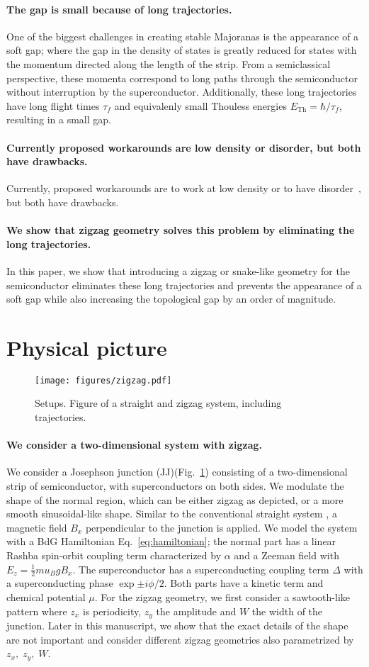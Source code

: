 \documentclass[english, twocolumn, 10pt, aps, superscriptaddress, floatfix, prb, citeautoscript]{revtex4-1}
\renewcommand{\comment}[2]{#2}
\renewcommand{\comment}{\paragraph}
\begin{document}
\comment{The gap is small because of long trajectories.}
One of the biggest challenges in creating stable Majoranas is the appearance of a soft gap; where the gap in the density of states is greatly reduced for states with the momentum directed along the length of the strip.
From a semiclassical perspective, these momenta correspond to long paths through the semiconductor without interruption by the superconductor.
Additionally, these long trajectories have long flight times $\tau_f$ and equivalenly small Thouless energies $E_{\textrm{Th}}=\hbar / \tau_f$, resulting in a small gap.

\comment{Currently proposed workarounds are low density or disorder, but both have drawbacks.}
Currently, proposed workarounds are to work at low density \cite{nijholt2015orbital} or to have disorder~\cite{haim_double-edge_2018}, but both have drawbacks.

\comment{We show that zigzag geometry solves this problem by eliminating the long trajectories.}
In this paper, we show that introducing a zigzag or snake-like geometry for the semiconductor eliminates these long trajectories and prevents the appearance of a soft gap while also increasing the topological gap by an order of magnitude.


\section{Physical picture}

\begin{figure}[!htb]
\texttt{[image: figures/zigzag.pdf]}
\caption{Setups. Figure of a straight and zigzag system, including trajectories.
\label{fig:setup}}
\end{figure}

\comment{We consider a two-dimensional system with zigzag.}
We consider a Josephson junction (JJ)(Fig.~\ref{fig:setup}) consisting of a two-dimensional strip of semiconductor, with superconductors on both sides.
We modulate the shape of the normal region, which can be either zigzag as depicted, or a more smooth sinusoidal-like shape.
Similar to the conventional straight system \cite{pientka2017topological}, a magnetic field $B_x$ perpendicular to the junction is applied.
We model the system with a BdG Hamiltonian Eq.~\eqref{eq:hamiltonian}; the normal part has a linear Rashba spin-orbit coupling term characterized by $\alpha$ and a Zeeman field with $E_z=\frac{1}{2}mu_B g B_x$.
The superconductor has a superconducting coupling term $\Delta$ with a superconducting phase $\exp{\pm i \phi/2}$.
Both parts have a kinetic term and chemical potential $\mu$.
For the zigzag geometry, we first consider a sawtooth-like pattern where $z_x$ is periodicity, $z_y$ the amplitude and $W$ the width of the junction.
Later in this manuscript, we show that the exact details of the shape are not important and consider different zigzag geometries also parametrized by $z_x, \; z_y, \; W$.
\end{document}
